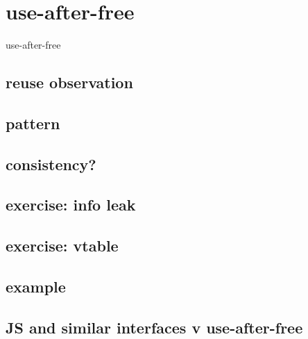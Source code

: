 \section{use-after-free}
\begin{frame}{use-after-free}
\end{frame}



\subsection{reuse observation}


\subsection{pattern}


\subsection{consistency?}


\subsection{exercise: info leak}


\subsection{exercise: vtable}


\subsection{example}


\subsection{JS and similar interfaces v use-after-free}


